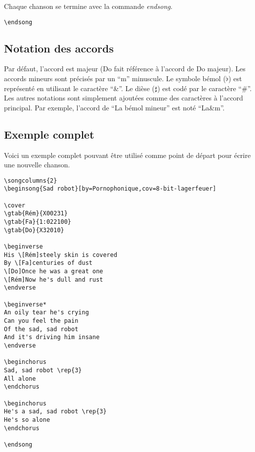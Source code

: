 \documentclass[a4paper]{article}
\begin{document}
Chaque chanson se termine avec la commande \emph{endsong}.

\begin{verbatim}
\endsong
\end{verbatim}

\subsection{Notation des accords}\label{sect:about}

Par défaut, l'accord est majeur (Do fait référence à l'accord de Do
majeur). Les accords mineurs sont précisés par un ``m'' minuscule.  Le
symbole bémol ($\flat$) est représenté en utilisant le caractère ``\&''.  Le
dièse ($\sharp$) est codé par le caractère ``\#''. Les autres notations sont
simplement ajoutées comme des caractères à l'accord principal. Par
exemple, l'accord de ``La bémol mineur'' est noté ``La\&m''.


\subsection{Exemple complet}

Voici un exemple complet pouvant être utilisé comme point de départ
pour écrire une nouvelle chanson.

\begin{verbatim}
\songcolumns{2}
\beginsong{Sad robot}[by=Pornophonique,cov=8-bit-lagerfeuer]

\cover
\gtab{Rém}{X00231}
\gtab{Fa}{1:022100}
\gtab{Do}{X32010}

\beginverse
His \[Rém]steely skin is covered
By \[Fa]centuries of dust
\[Do]Once he was a great one
\[Rém]Now he's dull and rust
\endverse

\beginverse*
An oily tear he's crying
Can you feel the pain
Of the sad, sad robot
And it's driving him insane
\endverse

\beginchorus
Sad, sad robot \rep{3}
All alone
\endchorus

\beginchorus
He's a sad, sad robot \rep{3}
He's so alone
\endchorus

\endsong
\end{verbatim}
\end{document}

